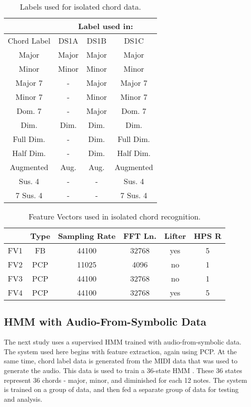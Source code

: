\documentclass{sig-alternate}
\begin{document}
\begin{table}
\centering
\begin{tabular}{|c|c|c|c|} \hline
&\multicolumn{3}{|c|}{Label used in:} \\ \hline
Chord Label & DS1A & DS1B & DS1C \\ \hline
Major & Major & Major & Major \\ \hline
Minor & Minor & Minor & Minor \\ \hline
Major 7 & - & Major & Major 7 \\ \hline
Minor 7 & - & Minor & Minor 7 \\ \hline
Dom. 7 & - & Major & Dom. 7 \\ \hline
Dim. & Dim. & Dim. & Dim. \\ \hline
Full Dim. & - & Dim. & Full Dim. \\ \hline
Half Dim. & - & Dim. & Half Dim. \\ \hline
Augmented & Aug. & Aug. & Augmented \\ \hline
Sus. 4 & - & - & Sus. 4 \\ \hline
7 Sus. 4 & - & - & 7 Sus. 4 \\ \hline
\end{tabular}
\caption{Labels used for isolated chord data.}
\label{tab:tab1}
\end{table} 

\begin{table}
\centering
\begin{tabular}{|c|c|c|c|c|c|} \hline
 & Type & Sampling Rate & FFT Ln. & Lifter & HPS R \\ \hline
FV1 & FB & 44100 & 32768 & yes & 5 \\ \hline
FV2 & PCP & 11025 & 4096 & no & 1 \\ \hline
FV3 & PCP & 44100 & 32768 & no & 1 \\ \hline
FV4 & PCP & 44100 & 32768 & yes & 5 \\ \hline
\end{tabular}
\caption{Feature Vectors used in isolated chord recognition.}
\label{tab:tab2}
\end{table} 

\subsection{HMM with Audio-From-Symbolic Data}

The next study \cite{Lee:2006} uses a supervised HMM trained with audio-from-symbolic data. The system used here begins with feature extraction, again using PCP. At the same time, chord label data is generated from the MIDI data that was used to generate the audio. This data is used to train a 36-state HMM \cite{Lee:2006}. These 36 states represent 36 chords - major, minor, and diminished for each 12 notes. The system is trained on a group of data, and then fed a separate group of data for testing and analysis.
\end{document}
